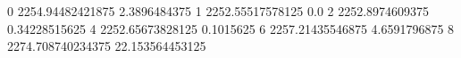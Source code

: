 0 2254.94482421875 2.3896484375
1 2252.55517578125 0.0
2 2252.8974609375 0.34228515625
4 2252.65673828125 0.1015625
6 2257.21435546875 4.6591796875
8 2274.708740234375 22.153564453125
